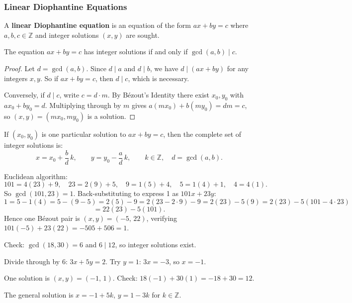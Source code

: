 \subsubsection*{Linear Diophantine Equations}

\begin{definition}
A \textbf{linear Diophantine equation} is an equation of the form $ax + by = c$ where $a, b, c \in \mathbb{Z}$ and integer solutions $(x, y)$ are sought.
\end{definition}

\begin{theorem}
The equation $ax + by = c$ has integer solutions if and only if $\gcd(a,b) \mid c$.
\end{theorem}
\begin{proof}
Let $d = \gcd(a,b)$. Since $d \mid a$ and $d \mid b$, we have $d \mid (ax + by)$ for any integers $x, y$. So if $ax + by = c$, then $d \mid c$, which is necessary.

Conversely, if $d \mid c$, write $c = d \cdot m$. By Bézout's Identity there exist $x_0, y_0$ with $ax_0 + by_0 = d$. Multiplying through by $m$ gives $a(mx_0) + b(my_0) = dm = c$, so $(x,y) = (mx_0, my_0)$ is a solution.
\end{proof}

\begin{remark}
If $(x_0, y_0)$ is one particular solution to $ax + by = c$, then the complete set of integer solutions is:
\[
x = x_0 + \frac{b}{d}\,k, \qquad y = y_0 - \frac{a}{d}\,k, \qquad k \in \mathbb{Z},\quad d = \gcd(a,b).
\]
\end{remark}

\begin{example}
Euclidean algorithm:
\[
101 = 4(23) + 9,\quad 23 = 2(9) + 5,\quad 9 = 1(5) + 4,\quad 5 = 1(4) + 1,\quad 4 = 4(1).
\]
So $\gcd(101,23) = 1$. Back-substituting to express 1 as $101x + 23y$:
\[
1 = 5 - 1(4) = 5 - (9-5) = 2(5) - 9 = 2(23-2\cdot9) - 9 = 2(23) - 5(9) = 2(23) - 5(101 - 4\cdot23)
\]
\[
= 22(23) - 5(101).
\]
Hence one Bézout pair is $(x, y) = (-5,\, 22)$, verifying $101(-5) + 23(22) = -505 + 506 = 1$.
\end{example}

\begin{example}[Solving $18x + 30y = 12$]
Check: $\gcd(18, 30) = 6$ and $6 \mid 12$, so integer solutions exist.

Divide through by 6: $3x + 5y = 2$. Try $y = 1$: $3x = -3$, so $x = -1$.

One solution is $(x,y) = (-1,\, 1)$. Check: $18(-1) + 30(1) = -18 + 30 = 12$. \checkmark

The general solution is $x = -1 + 5k$, $y = 1 - 3k$ for $k \in \mathbb{Z}$.
\end{example}

